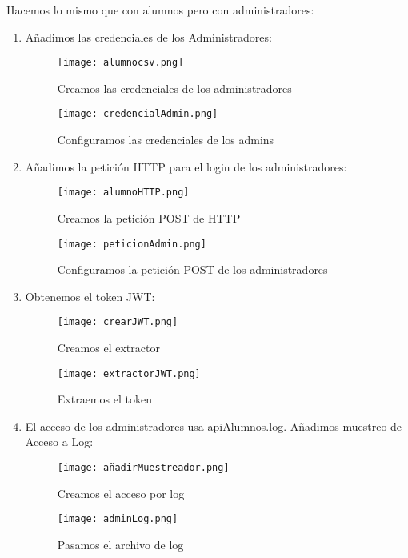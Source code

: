 \newpage
Hacemos lo mismo que con alumnos pero con administradores:
\begin{enumerate}
	\item Añadimos las credenciales de los Administradores:
	\begin{figure}[H]
		\centering
		\texttt{[image: alumnocsv.png]}
		\caption{Creamos las credenciales de los administradores}
	\end{figure}
	\begin{figure}[H]
		\centering
		\texttt{[image: credencialAdmin.png]}
		\caption{Configuramos las credenciales de los admins}
	\end{figure}

\newpage

	\item Añadimos la petición HTTP para el login de los administradores:
	\begin{figure}[H]
		\centering
		\texttt{[image: alumnoHTTP.png]}
		\caption{Creamos la petición POST de HTTP}
	\end{figure}
	\begin{figure}[H]
		\centering
		\texttt{[image: peticionAdmin.png]}
		\caption{Configuramos la petición POST de los administradores}
	\end{figure}

\newpage
	
	\item Obtenemos el token JWT:
	\begin{figure}[H]
		\centering
		\texttt{[image: crearJWT.png]}
		\caption{Creamos el extractor}
	\end{figure}
	\begin{figure}[H]
		\centering
		\texttt{[image: extractorJWT.png]}
		\caption{Extraemos el token}
	\end{figure}

\newpage

	\item El acceso de los administradores usa apiAlumnos.log. Añadimos muestreo de Acceso a Log:
	\begin{figure}[H]
		\centering
		\texttt{[image: añadirMuestreador.png]}
		\caption{Creamos el acceso por log}
	\end{figure}
	\begin{figure}[H]
		\centering
		\texttt{[image: adminLog.png]}
		\caption{Pasamos el archivo de log}
	\end{figure}
	

\end{enumerate}
